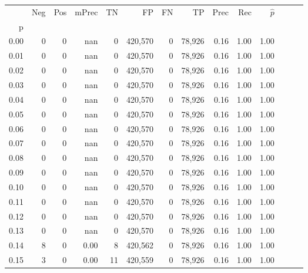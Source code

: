 \begin{tabular}{rrrrrrrrrrrrrr}
\toprule
{} &     Neg &    Pos & mPrec &       TN &       FP &      FN &      TP &  Prec &   Rec & $\hat{p}$ \\
p    &         &        &       &          &          &         &         &       &       &           \\
\midrule
0.00 &       0 &      0 &   nan &        0 &  420,570 &       0 &  78,926 &  0.16 &  1.00 &      1.00 \\
0.01 &       0 &      0 &   nan &        0 &  420,570 &       0 &  78,926 &  0.16 &  1.00 &      1.00 \\
0.02 &       0 &      0 &   nan &        0 &  420,570 &       0 &  78,926 &  0.16 &  1.00 &      1.00 \\
0.03 &       0 &      0 &   nan &        0 &  420,570 &       0 &  78,926 &  0.16 &  1.00 &      1.00 \\
0.04 &       0 &      0 &   nan &        0 &  420,570 &       0 &  78,926 &  0.16 &  1.00 &      1.00 \\
0.05 &       0 &      0 &   nan &        0 &  420,570 &       0 &  78,926 &  0.16 &  1.00 &      1.00 \\
0.06 &       0 &      0 &   nan &        0 &  420,570 &       0 &  78,926 &  0.16 &  1.00 &      1.00 \\
0.07 &       0 &      0 &   nan &        0 &  420,570 &       0 &  78,926 &  0.16 &  1.00 &      1.00 \\
0.08 &       0 &      0 &   nan &        0 &  420,570 &       0 &  78,926 &  0.16 &  1.00 &      1.00 \\
0.09 &       0 &      0 &   nan &        0 &  420,570 &       0 &  78,926 &  0.16 &  1.00 &      1.00 \\
0.10 &       0 &      0 &   nan &        0 &  420,570 &       0 &  78,926 &  0.16 &  1.00 &      1.00 \\
0.11 &       0 &      0 &   nan &        0 &  420,570 &       0 &  78,926 &  0.16 &  1.00 &      1.00 \\
0.12 &       0 &      0 &   nan &        0 &  420,570 &       0 &  78,926 &  0.16 &  1.00 &      1.00 \\
0.13 &       0 &      0 &   nan &        0 &  420,570 &       0 &  78,926 &  0.16 &  1.00 &      1.00 \\
0.14 &       8 &      0 &  0.00 &        8 &  420,562 &       0 &  78,926 &  0.16 &  1.00 &      1.00 \\
0.15 &       3 &      0 &  0.00 &       11 &  420,559 &       0 &  78,926 &  0.16 &  1.00 &      1.00 \\

\end{tabular}

